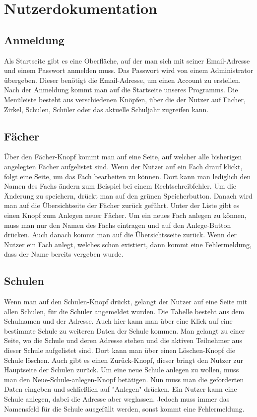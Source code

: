 \section{Nutzerdokumentation}
\subsection{Anmeldung}
Als Startseite gibt es eine Oberfläche, auf der man sich mit seiner Email-Adresse und einem Passwort anmelden muss. Das Passwort wird von einem Administrator übergeben. Dieser benötigt die Email-Adresse, um einen Account zu erstellen. Nach der Anmeldung kommt man auf die Startseite unseres Programms. Die Menüleiste besteht aus verschiedenen Knöpfen, über die der Nutzer auf Fächer, Zirkel, Schulen, Schüler oder das aktuelle Schuljahr zugreifen kann.

\subsection{Fächer}
Über den Fächer-Knopf kommt man auf eine Seite, auf welcher alle bisherigen angelegten Fächer aufgelistet sind. Wenn der Nutzer auf ein Fach drauf klickt, folgt eine Seite, um das Fach bearbeiten zu können. Dort kann man lediglich den Namen des Fachs ändern zum Beispiel bei einem Rechtschreibfehler. Um die Änderung zu speichern, drückt man auf den grünen Speicherbutton. Danach wird man auf die Übersichtseite der Fächer zurück geführt. Unter der Liste gibt es einen Knopf zum Anlegen neuer Fächer. Um ein neues Fach anlegen zu können, muss man nur den Namen des Fachs eintragen und auf den Anlege-Button drücken. Auch danach kommt man auf die Übersichtsseite zurück. Wenn der Nutzer ein Fach anlegt, welches schon existiert, dann kommt eine Fehlermeldung, dass der Name bereits vergeben wurde.

\subsection{Schulen}
Wenn man auf den Schulen-Knopf drückt, gelangt der Nutzer auf eine Seite mit allen Schulen, für die Schüler angemeldet wurden. Die Tabelle besteht aus dem Schulnamen und der Adresse. Auch hier kann man über eine Klick auf eine bestimmte Schule zu weiteren Daten der Schule kommen. Man gelangt zu einer Seite, wo die Schule und deren Adresse stehen und die aktiven Teilnehmer aus dieser Schule aufgelistet sind. Dort kann man über einen Löschen-Knopf die Schule löschen. Auch gibt es einen Zurück-Knopf, dieser bringt den Nutzer zur Hauptseite der Schulen zurück. Um eine neue Schule anlegen zu wollen, muss man den Neue-Schule-anlegen-Knopf betätigen. Nun muss man die geforderten Daten eingeben und schließlich auf "Anlegen" drücken. Ein Nutzer kann eine Schule anlegen, dabei die Adresse aber weglassen. Jedoch muss immer das Namensfeld für die Schule ausgefüllt werden, sonst kommt eine Fehlermeldung.

